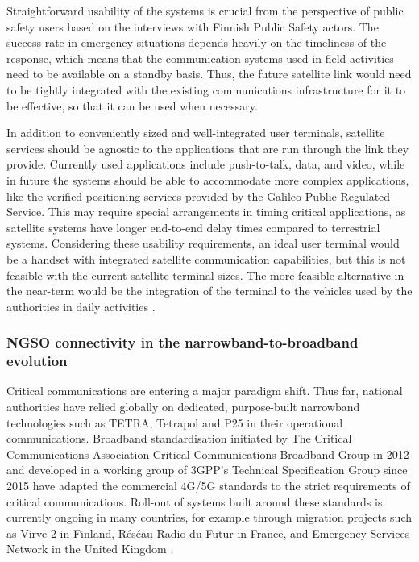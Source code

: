 \documentclass[english, 12pt, a4paper, elec, utf8, a-1b, online]{aaltothesis}
\begin{document}
Straightforward usability of the systems is crucial from the perspective of public safety users based on the interviews with Finnish Public Safety actors.
The success rate in emergency situations depends heavily on the timeliness of the response, which means that the communication systems used in field activities need to be available on a standby basis.
Thus, the future satellite link would need to be tightly integrated with the existing communications infrastructure for it to be effective, so that it can be used when necessary.

In addition to conveniently sized and well-integrated user terminals, satellite services should be agnostic to the applications that are run through the link they provide. Currently used applications include push-to-talk, data, and video, while in future the systems should be able to accommodate more complex applications, like the verified positioning services provided by the Galileo Public Regulated Service. This may require special arrangements in timing critical applications, as satellite systems have longer end-to-end delay times compared to terrestrial systems.
Considering these usability requirements, an ideal user terminal would be a handset with integrated satellite communication capabilities, but this is not feasible with the current satellite terminal sizes. The more feasible alternative in the near-term would be the integration of the terminal to the vehicles used by the authorities in daily activities \cite{saynevirta2021satellite}.

\subsubsection{NGSO connectivity in the narrowband-to-broadband evolution}
Critical communications are entering a major paradigm shift. Thus far, national authorities have relied globally on dedicated, purpose-built narrowband technologies such as TETRA, Tetrapol and P25 in their operational communications. Broadband standardisation initiated by The Critical Communications Association Critical Communications Broadband Group in 2012 and developed in a working group of 3GPP's Technical Specification Group since 2015 have adapted the commercial 4G/5G standards to the strict requirements of critical communications. Roll-out of systems built around these standards is currently ongoing in many countries, for example through migration projects such as Virve 2 in Finland, Réséau Radio du Futur in France, and Emergency Services Network in the United Kingdom \cite{stojkovic2016public}.
\end{document}
